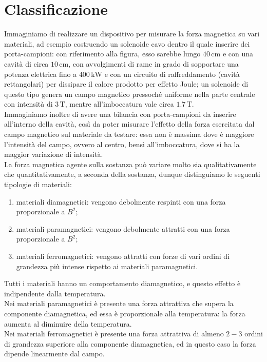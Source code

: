\documentclass[]{article}
\begin{document}
\section{Classificazione}

Immaginiamo di realizzare un dispositivo per misurare la forza magnetica su vari materiali, ad esempio costruendo un solenoide cavo dentro il quale inserire dei porta-campioni: con riferimento alla figura, esso sarebbe lungo $ 40\,\text{cm} $ e con una cavità di circa $ 10\,\text{cm} $, con avvolgimenti di rame in grado di sopportare una potenza elettrica fino a $ 400\,\text{kW} $ e con un circuito di raffreddamento (cavità rettangolari) per dissipare il calore prodotto per effetto Joule; un solenoide di questo tipo genera un campo magnetico pressoché uniforme nella parte centrale con intensità di $ 3\,\text{T} $, mentre all'imboccatura vale circa $ 1.7\,\text{T} $. \\ 
%
Immaginiamo inoltre di avere una bilancia con porta-campioni da inserire all'interno della cavità, così da poter misurare l'effetto della forza esercitata dal campo magnetico sul materiale da testare: essa non è massima dove è maggiore l'intensità del campo, ovvero al centro, bensì all'imboccatura, dove si ha la maggior variazione di intensità. \\ 
%
La forza magnetica agente sulla sostanza può variare molto sia qualitativamente che quantitativamente, a seconda della sostanza, dunque distinguiamo le seguenti tipologie di materiali:
\begin{enumerate}
	\item materiali diamagnetici: vengono debolmente respinti con una forza proporzionale a $ B^2 $;
	\item materiali paramagnetici: vengono debolmente attratti con una forza proporzionale a $ B^2 $;
	\item materiali ferromagnetici: vengono attratti con forze di vari ordini di grandezza più intense rispetto ai materiali paramagnetici. 
\end{enumerate}
Tutti i materiali hanno un comportamento diamagnetico, e questo effetto è indipendente dalla temperatura. \\ 
Nei materiali paramagnetici è presente una forza attrattiva che supera la componente diamagnetica, ed essa è proporzionale alla temperatura: la forza aumenta al diminuire della temperatura. \\ 
Nei materiali ferromagnetici è presente una forza attrattiva di almeno $ 2-3 $ ordini di grandezza superiore alla componente diamagnetica, ed in questo caso la forza dipende linearmente dal campo. \\ 
\end{document}
